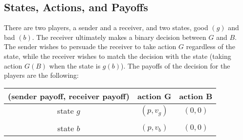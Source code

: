 \documentclass[11pt]{extarticle}
\begin{document}
\subsection{States, Actions, and Payoffs}\label{model}
There are two players, a sender and a receiver, and two states, good $(g)$ and bad $(b)$. The receiver ultimately makes a binary decision between $G$ and $B$. The sender wishes to persuade the receiver to take action $G$ regardless of the state, while the receiver wishes to match the decision with the state (taking action $G (B)$ when the state is $g (b)$). The payoffs of the decision for the players are the following:
\begin{table}[H] \centering 
	\small
	\begin{tabular}{c c c}
		\\
		\hline
		(sender payoff, receiver payoff)& action G & action B \\
		\hline
		state $g$ & $(p,v_g)$ & $(0,0)$  \\
		&&\\
		state $b$&$(p,v_b)$ & $(0,0)$ \\
		\hline
	\end{tabular}
\end{table}
\end{document}
